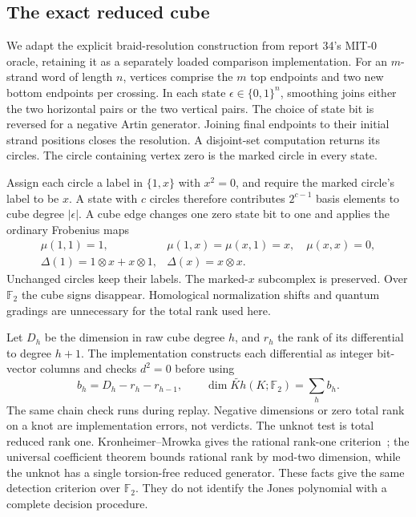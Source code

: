 \subsection{The exact reduced cube}

We adapt the explicit braid-resolution construction from report 34's MIT-0
oracle, retaining it as a separately loaded comparison implementation.
For an $m$-strand word of length $n$, vertices comprise the $m$ top endpoints
and two new bottom endpoints per crossing. In each state
$\epsilon\in\{0,1\}^n$, smoothing joins either the two horizontal pairs or
the two vertical pairs. The choice of state bit is reversed for a negative
Artin generator. Joining final endpoints to their initial strand positions
closes the resolution. A disjoint-set computation returns its circles.
The circle containing vertex zero is the marked circle in every state.

Assign each circle a label in $\{1,x\}$ with $x^2=0$, and require the marked
circle's label to be $x$. A state with $c$ circles therefore contributes
$2^{c-1}$ basis elements to cube degree $|\epsilon|$. A cube edge changes
one zero state bit to one and applies the ordinary Frobenius maps
\[
 \begin{array}{ll}
 \mu(1,1)=1,&\mu(1,x)=\mu(x,1)=x,\quad\mu(x,x)=0,\\
 \Delta(1)=1\otimes x+x\otimes1,&\Delta(x)=x\otimes x.
 \end{array}
\]
Unchanged circles keep their labels. The marked-$x$ subcomplex is preserved.
Over $\mathbb F_2$ the cube signs disappear. Homological normalization shifts
and quantum gradings are unnecessary for the total rank used here.

Let $D_h$ be the dimension in raw cube degree $h$, and $r_h$ the rank of its
differential to degree $h+1$. The implementation constructs each differential
as integer bit-vector columns and checks $d^2=0$ before using
\[
 b_h=D_h-r_h-r_{h-1},\qquad
 \dim\widetilde{Kh}(K;\mathbb F_2)=\sum_h b_h.
\]
The same chain check runs during replay. Negative dimensions or zero total
rank on a knot are implementation errors, not verdicts. The unknot test is
total reduced rank one. Kronheimer--Mrowka gives the rational rank-one
criterion~\cite{km}; the universal coefficient theorem bounds rational rank
by mod-two dimension, while the unknot has a single torsion-free reduced
generator. These facts give the same detection criterion over $\mathbb F_2$.
They do not identify the Jones polynomial with a complete decision procedure.

